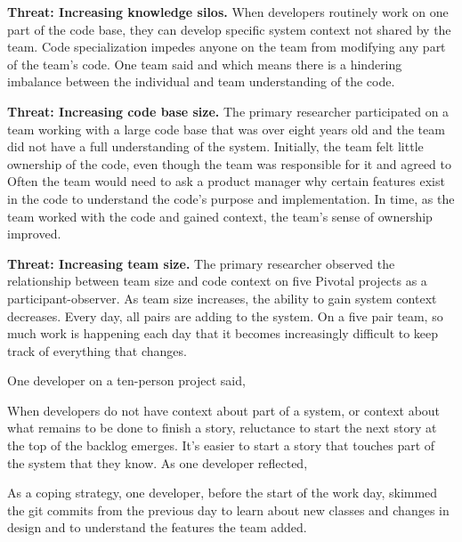 \textbf{Threat: Increasing knowledge silos.} When developers routinely work on one part of the code base, they can develop specific system context not shared by the team. Code specialization impedes anyone on the team from modifying any part of the team's code.  One team said  and  which means there is a hindering imbalance between the individual and team understanding of the code.

\textbf{Threat: Increasing code base size.} The primary researcher participated on a team working with a large code base that was over eight years old and the team did not have a full understanding of the system. Initially, the team felt little ownership of the code, even though the team was responsible for it and agreed to  Often the team would need to ask a product manager why certain features exist in the code to understand the code's purpose and implementation. In time, as the team worked with the code and gained context, the team's sense of ownership improved.

\textbf{Threat: Increasing team size.} The primary researcher observed the relationship between team size and code context on five Pivotal projects as a participant-observer. As team size increases, the ability to gain system context decreases. Every day, all pairs are adding to the system. On a five pair team, so much work is happening each day that it becomes increasingly difficult to keep track of everything that changes.

One developer on a ten-person project said, 

When developers do not have context about part of a system, or context about what remains to be done to finish a story, reluctance to start the next story at the top of the backlog emerges. It's easier to start a story that touches part of the system that they know. As one developer reflected, 

As a coping strategy, one developer, before the start of the work day, skimmed the git commits from the previous day to learn about new classes and changes in design and to understand the features the team added. 

